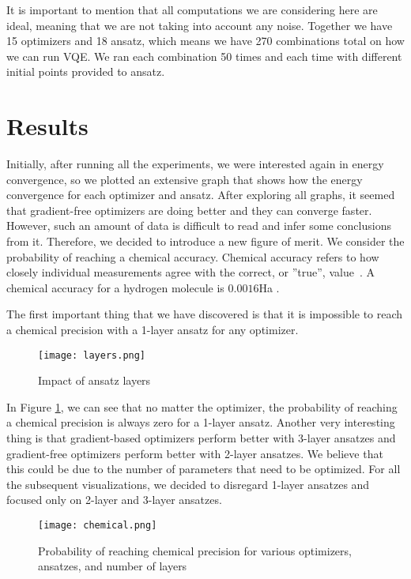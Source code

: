 It is important to mention that all computations we are considering here are ideal, meaning that we are not taking into account any noise. Together we have 15 optimizers and 18 ansatz, which means we have 270 combinations total on how we can run VQE. We ran each combination 50 times and each time with different initial points provided to ansatz. 

\section{Results} 
Initially, after running all the experiments, we were interested again in energy convergence, so we plotted an extensive graph that shows how the energy convergence for each optimizer and ansatz. After exploring all graphs, it seemed that gradient-free optimizers are doing better and they can converge faster. However, such an amount of data is difficult to read and infer some conclusions from it. Therefore, we decided to introduce a new figure of merit. We consider the probability of reaching a chemical accuracy. Chemical accuracy refers to how closely individual measurements agree with the correct, or ''true'', value~\cite{chemistry}. A chemical accuracy for a hydrogen molecule is $0.0016$Ha . 


The first important thing that we have discovered is that it is impossible to reach a chemical precision with a 1-layer ansatz for any optimizer.
\begin{figure}[H]
    \centering
    \texttt{[image: layers.png]}
    \caption{Impact of ansatz layers}
    \label{fig:ansatz-layers}
\end{figure}

In Figure \ref{fig:ansatz-layers}, we can see that no matter the optimizer, the probability of reaching a chemical precision is always zero for a 1-layer ansatz. Another very interesting thing is that gradient-based optimizers perform better with 3-layer ansatzes and gradient-free optimizers perform better with 2-layer ansatzes. We believe that this could be due to the number of parameters that need to be optimized. For all the subsequent visualizations, we decided to disregard 1-layer ansatzes and focused only on 2-layer and 3-layer ansatzes.

\begin{figure}[H]
    \centering
    \texttt{[image: chemical.png]}
    \caption{Probability of reaching chemical precision for various optimizers, ansatzes, and number of layers}
    \label{fig:chemical}
\end{figure}

